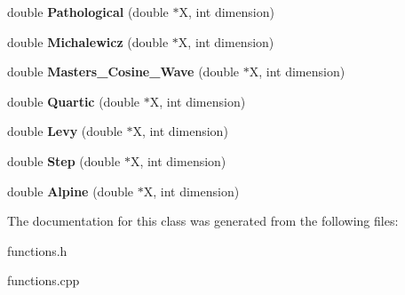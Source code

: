 \begin{DoxyCompactItemize}
double {\bfseries Pathological} (double $\ast$X, int dimension)
\item 
\mbox{\label{classfunctions_aea042128109cf3893c65de9402b966ce}} 
double {\bfseries Michalewicz} (double $\ast$X, int dimension)
\item 
\mbox{\label{classfunctions_a3008a09a0d34abdcb00534216027b17a}} 
double {\bfseries Masters\+\_\+\+Cosine\+\_\+\+Wave} (double $\ast$X, int dimension)
\item 
\mbox{\label{classfunctions_acc554d330b8848a23c29f2718efbd5f4}} 
double {\bfseries Quartic} (double $\ast$X, int dimension)
\item 
\mbox{\label{classfunctions_aac081448f82bfaa05fa92e7b37188e64}} 
double {\bfseries Levy} (double $\ast$X, int dimension)
\item 
\mbox{\label{classfunctions_a9d7e0c3e9f0fbb3acef497fc9e6e68e7}} 
double {\bfseries Step} (double $\ast$X, int dimension)
\item 
\mbox{\label{classfunctions_a757a7d37a218dc41c708b48f3bf57c38}} 
double {\bfseries Alpine} (double $\ast$X, int dimension)
\end{DoxyCompactItemize}


The documentation for this class was generated from the following files\+:\begin{DoxyCompactItemize}
\item 
functions.\+h\item 
functions.\+cpp\end{DoxyCompactItemize}
